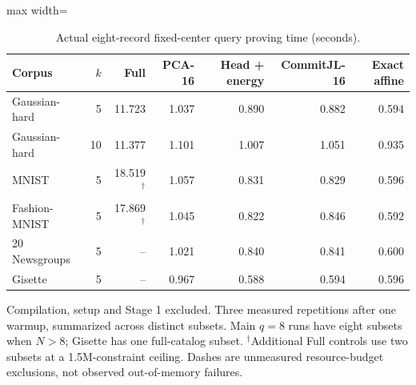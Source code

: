\begin{table}[tp]
\caption{Actual eight-record fixed-center query proving time (seconds).}\label{tab:query8}
\centering\small
\begin{adjustbox}{max width=\textwidth}
\begin{tabular}{@{}lrrrrrr@{}}
\toprule
Corpus & $k$ & Full & PCA-16 & Head + energy & CommitJL-16 & Exact affine \\
\midrule
Gaussian-hard & 5 & 11.723 & 1.037 & 0.890 & 0.882 & 0.594 \\
Gaussian-hard & 10 & 11.377 & 1.101 & 1.007 & 1.051 & 0.935 \\
MNIST & 5 & 18.519$^{\dagger}$ & 1.057 & 0.831 & 0.829 & 0.596 \\
Fashion-MNIST & 5 & 17.869$^{\dagger}$ & 1.045 & 0.822 & 0.846 & 0.592 \\
20 Newsgroups & 5 & -- & 1.021 & 0.840 & 0.841 & 0.600 \\
Gisette & 5 & -- & 0.967 & 0.588 & 0.594 & 0.596 \\
\bottomrule
\end{tabular}
\end{adjustbox}
\par\vspace{3pt}\begin{minipage}{0.98\textwidth}\footnotesize Compilation, setup and Stage 1 excluded. Three measured repetitions after one warmup, summarized across distinct subsets. Main $q=8$ runs have eight subsets when $N>8$; Gisette has one full-catalog subset. $^{\dagger}$Additional Full controls use two subsets at a 1.5M-constraint ceiling. Dashes are unmeasured resource-budget exclusions, not observed out-of-memory failures.\end{minipage}
\end{table}
